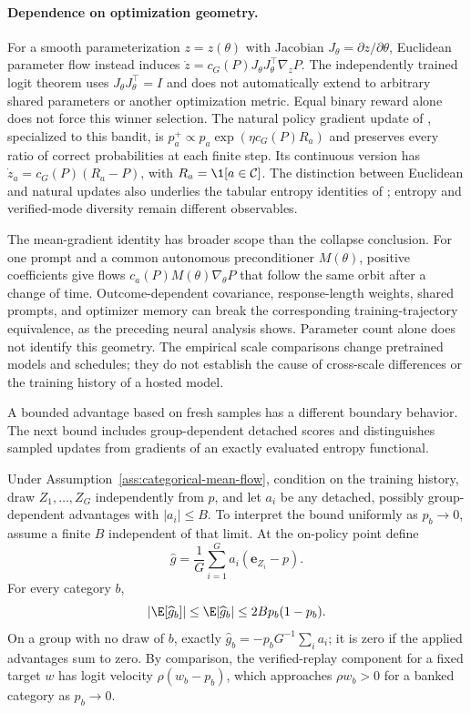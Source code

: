 \paragraph{Dependence on optimization geometry.}
For a smooth parameterization $z=z(\theta)$ with Jacobian
$J_\theta=\partial z/\partial\theta$, Euclidean parameter flow instead
induces $\dot z=c_G(P)J_\theta J_\theta^\top\nabla_zP$. The independently
trained logit theorem uses $J_\theta J_\theta^\top=I$ and does not automatically
extend to arbitrary shared parameters or another optimization metric. Equal
binary reward alone does not force this winner selection. The natural policy
gradient update of \citet[Lemma~15]{agarwal2021policygradient}, specialized to
this bandit, is $p_a^+\propto p_a\exp(\eta c_G(P)R_a)$ and preserves
every ratio of correct probabilities at each finite step. Its continuous
version has $\dot z_a=c_G(P)(R_a-P)$, with
$R_a=\1[a\in\mathcal C]$. The distinction between Euclidean and natural
updates also underlies the tabular entropy identities of
\citet[Theorems~1--2]{cui2025entropy}; entropy and verified-mode diversity
remain different observables.

The mean-gradient identity has broader scope than the collapse conclusion.
For one prompt and a common autonomous preconditioner $M(\theta)$, positive
coefficients give flows $c_a(P)M(\theta)\nabla_\theta P$ that follow the same
orbit after a change of time. Outcome-dependent covariance, response-length
weights, shared prompts, and optimizer memory can break the corresponding
training-trajectory equivalence, as the preceding neural analysis shows.
Parameter count alone does not identify this geometry. The empirical scale
comparisons change pretrained models and schedules; they do not establish
the cause of cross-scale differences or the training history of a hosted
model.

A bounded advantage based on fresh samples has a different boundary behavior.
The next bound includes group-dependent detached scores and distinguishes
sampled updates from gradients of an exactly evaluated entropy functional.

\begin{lemma}
\enforcehalffinalproseline
\label{lem:sampled-score-bound}
Under Assumption~\ref{ass:categorical-mean-flow}, condition on the training history, draw
$Z_1,\ldots,Z_G$ independently from $p$, and let $a_i$ be any detached,
possibly group-dependent advantages with $|a_i|\le B$. To interpret the
bound uniformly as $p_b\to0$, assume a finite $B$ independent of that limit.
At the on-policy point define
\[
 \widehat g=\frac1G\sum_{i=1}^G a_i(\mathbf e_{Z_i}-p).
\]
For every category $b$,
\[
 |\E[\widehat g_b]|\le\E|\widehat g_b|
 \le 2B p_b(1-p_b).
\]
On a group with no draw of $b$, exactly
$\widehat g_b=-p_bG^{-1}\sum_i a_i$; it is zero if the applied advantages
sum to zero. By comparison, the verified-replay component for a fixed target
$w$ has logit velocity $\rho(w_b-p_b)$, which approaches $\rho w_b>0$
for a banked category as $p_b\to0$.
\end{lemma}

